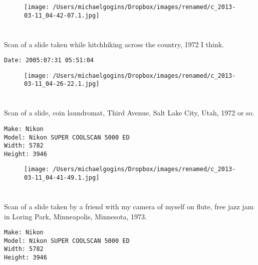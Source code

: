 \documentclass[11pt,letter,DIV=14,paper=landscape]{scrbook}
\begin{document}
\begin{figure}
\texttt{[image: /Users/michaelgogins/Dropbox/images/renamed/c\_2013-03-11\_04-42-07.1.jpg]}
\end{figure}

\clearpage
\section{\protect{}}
\noindent Scan of a slide taken while hitchhiking across the country, 1972 I think.
\noindent
\begin{lstlisting}
Date: 2005:07:31 05:51:04
\end{lstlisting}
\clearpage

\begin{figure}
\texttt{[image: /Users/michaelgogins/Dropbox/images/renamed/c\_2013-03-11\_04-26-22.1.jpg]}
\end{figure}
    
\clearpage
\section{\protect{}}
\noindent Scan of a slide, coin laundromat, Third Avenue, Salt Lake City, Utah, 1972 or so.
\noindent
\begin{lstlisting}
Make: Nikon
Model: Nikon SUPER COOLSCAN 5000 ED
Width: 5782
Height: 3946
\end{lstlisting}

\clearpage
\begin{figure}
\texttt{[image: /Users/michaelgogins/Dropbox/images/renamed/c\_2013-03-11\_04-41-49.1.jpg]}
\end{figure}

\clearpage
\section{\protect{}}
\noindent Scan of a slide taken by a friend with my camera of myself on flute, free jazz jam in Loring Park, Minneapolis, Minnesota, 1973.
\noindent
\begin{lstlisting}
Make: Nikon
Model: Nikon SUPER COOLSCAN 5000 ED
Width: 5782
Height: 3946
\end{lstlisting}
\clearpage
\end{document}
